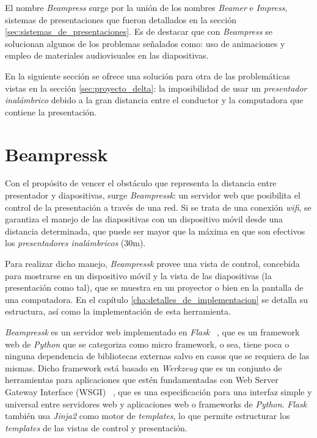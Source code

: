 		El nombre \textit{Beampress} surge por la unión de los nombres \textit{Beamer} e \textit{Impress}, sistemas de presentaciones que fueron detallados en la sección \ref{sec:sistemas_de_presentaciones}. Es de destacar que con \textit{Beampress} se solucionan algunos de los problemas señalados como: uso de animaciones y empleo de materiales audiovisuales en las diapositivas.	

	En la siguiente sección se ofrece una solución para otra de las problemáticas vistas en la sección \ref{sec:proyecto_delta}: la imposibilidad de usar un \textit{presentador inalámbrico} debido a la gran distancia entre el conductor y la computadora que contiene la presentación.
	
	\section{Beampressk} %
	\label{sec:beampressk}
		Con el propósito de vencer el obstáculo que representa la distancia entre presentador y diapositivas, surge \textit{Beampressk}: un servidor web que posibilita el control de la presentación a través de una red. Si se trata de una conexión \textit{wifi}, se garantiza el manejo de las diapositivas con un dispositivo móvil desde una distancia determinada, que puede ser mayor que la máxima en que son efectivos los \textit{presentadores inalámbricos} (30m).

		Para realizar dicho manejo, \textit{Beampressk} provee una vista de control, concebida para mostrarse en un dispositivo móvil y la vista de las diapositivas (la presentación como tal), que se muestra en un proyector o bien en la pantalla de una computadora. En el capítulo \ref{cha:detalles_de_implementacion} se detalla su estructura, así como la implementación de esta herramienta.

		\textit{Beampressk} es un servidor web implementado en \textit{Flask} ~\cite{flask}, que es un framework web de \textit{Python} que se categoriza como micro framework, o sea, tiene poca o ninguna dependencia de bibliotecas externas salvo en casos que se requiera de las mismas. Dicho framework está basado en \textit{Werkzeug} que es un conjunto de herramientas para aplicaciones que estén fundamentadas con Web Server Gateway Interface (WSGI) ~\cite{wsgi}, que es una especificación para una interfaz simple y universal entre servidores web y aplicaciones web o frameworks de \textit{Python}. \textit{Flask} también usa \textit{Jinja2} como motor de \textit{templates}, lo que permite estructurar los \textit{templates} de las vistas de control y presentación.


